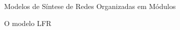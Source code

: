 \begin{section}{Modelos de Síntese de Redes Organizadas em Módulos}
\begin{subsection}{O modelo LFR}

\end{subsection}

\end{section}

